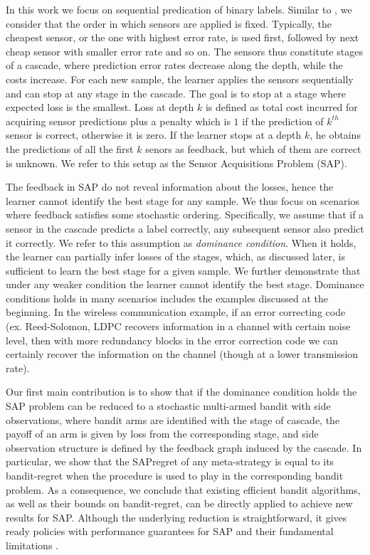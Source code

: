\documentclass{article}
\begin{document}
In this work we focus on sequential predication of binary labels.  Similar to \cite{ML13_MultistageClassifier_TrapezSaligramaCastanon}, we consider that the order in which sensors are applied is fixed. Typically, the cheapest sensor, or the one with highest error rate, is used first, followed by next cheap sensor with smaller error rate and so on. The sensors thus constitute stages of a cascade, where prediction error rates decrease along the depth, while the costs increase. For each new sample, the learner applies the sensors sequentially and can stop at any stage in the cascade. The goal is to stop at a stage where expected loss is the smallest. Loss at depth $k$ is defined as total cost incurred for acquiring sensor predictions plus a penalty which is $1$ if the prediction of $k^{th}$ sensor is correct, otherwise it is zero. If the learner stops at a depth $k$, he obtains the predictions of all the first $k$ senors as feedback, but which of them are correct is unknown. We refer to this setup as the Sensor Acquisitions Problem (SAP). 

The feedback in SAP do not reveal information about the losses, hence the learner cannot identify the best stage for any sample. 
We thus focus on scenarios where feedback satisfies some stochastic ordering. Specifically, we assume that if a sensor in the cascade predicts a label correctly, any subsequent sensor also predict it correctly. We refer to this assumption as {\em dominance condition}. When it holds, the learner can partially infer losses of the stages, which, as discussed later, is sufficient to learn the best stage for a given sample. We further demonstrate that under any weaker condition the learner cannot identify the best stage. Dominance conditions holds in many scenarios includes the examples discussed at the beginning. In the wireless communication example, if an error correcting code (ex. Reed-Solomon, LDPC \cite{Book_InferenceLearning_MacKay} recovers information in a channel with certain noise level, then with more redundancy blocks in the error correction code we can certainly recover the information on the channel (though at a lower transmission rate).     

Our first main contribution is to show that if the dominance condition holds the SAP problem can be reduced to 
a stochastic multi-armed bandit with side observations,
where bandit arms are identified with the stage of cascade,
the payoff of an arm is given by loss from the corresponding stage, and side observation structure is defined by the feedback graph induced by the cascade. In particular, we show that the SAPregret
of any meta-strategy is equal to its bandit-regret
when the procedure is used to play in the corresponding
bandit problem. As a consequence, we conclude that existing efficient
bandit algorithms, as well as their bounds on bandit-regret,
can be directly applied to achieve new results
for SAP. Although the underlying
reduction is straightforward, it gives ready policies with performance guarantees for SAP and their fundamental limitations .
\end{document}
